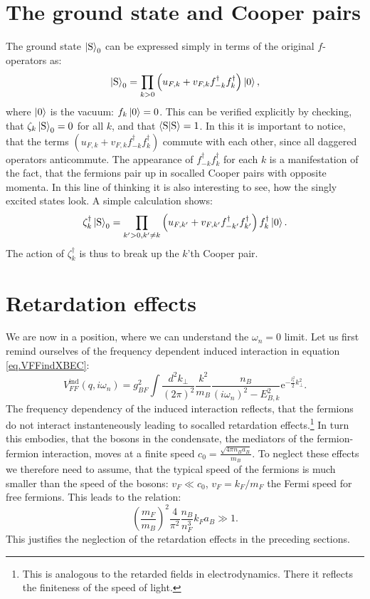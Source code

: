 \section{The ground state and Cooper pairs}
The ground state $\ket{\text{S}}_0$ can be expressed simply in terms of the original $f$-operators as:
\begin{equation}
\ket{\text{S}}_0 = \prod_{k > 0} \left(u_{F,k} + v_{F,k}f^\dagger_{-k}f^\dagger_k\right)\ket{0},
\end{equation} 
where $\ket{0}$ is the vacuum: $f_k\ket{0} = 0$. This can be verified explicitly by checking, that $\zeta_k\ket{\text{S}}_0 = 0$ for all $k$, and that 
$\braket{\text{S}|\text{S}} = 1$. In this it is important to notice, that the terms $(u_{F,k} + v_{F,k}f^\dagger_{-k}f^\dagger_k)$ commute with each other, since all daggered operators anticommute. The appearance of $f^\dagger_{-k}f^\dagger_k$ for each $k$ is a manifestation of the fact, that the fermions pair up in socalled Cooper pairs with opposite momenta. In this line of thinking it is also interesting to see, how the singly excited states look. A simple calculation shows:
\begin{equation}
\zeta^\dagger_k\ket{\text{S}}_0 = \prod_{k' > 0, k' \neq k }\left(u_{F,k'} + v_{F,k'}f^\dagger_{-k'}f^\dagger_{k'}\right)f^\dagger_k\ket{0}.
\end{equation}
The action of $\zeta^\dagger_k$ is thus to break up the $k$'th Cooper pair. 


\section{Retardation effects} \label{sec.RetardationEffects}
We are now in a position, where we can understand the $\omega_n = 0$ limit. Let us first remind ourselves of the frequency dependent induced interaction in equation \eqref{eq.VFFindXBEC}:
\begin{equation}
V_{FF}^\text{ind}(q,i\omega_n) = g_{BF}^2\int\frac{d^2k_\perp}{(2\pi)^2}\frac{k^2}{m_B}\frac{n_B}{(i\omega_n)^2-E_{B,k}^2}\text{e}^{-\frac{l_t^2}{2}k_\perp^2}. \nonumber
\end{equation}
The frequency dependency of the induced interaction reflects, that the fermions do not interact instanteneously leading to socalled retardation effects.\footnote{This is analogous to the retarded fields in electrodynamics. There it reflects the finiteness of the speed of light.} In turn this embodies, that the bosons in the condensate, the mediators of the fermion-fermion interaction, moves at a finite speed $c_0 = \frac{\sqrt{4\pi n_B a_B}}{m_B}$. To neglect these effects we therefore need to assume, that the typical speed of the fermions is much smaller than the speed of the bosons: $v_F \ll c_0$, $v_F = k_F/m_F$ the Fermi speed for free fermions. This leads to the relation:
\begin{equation}
\left(\frac{m_F}{m_B}\right)^2\frac{4}{\pi^2}\frac{n_B}{n_F^3}k_Fa_B \gg 1.
\label{eq.RetardationEffectsneglectionassumption}
\end{equation}
This justifies the neglection of the retardation effects in the preceding sections. 


